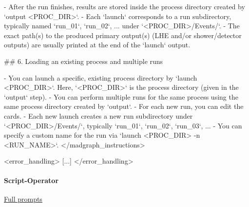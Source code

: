 \documentclass[submission, Phys]{SciPost}
\begin{document}
\begin{promptblocklit}
- After the run finishes, results are stored inside the process directory created by `output <PROC_DIR>`.
- Each `launch` corresponds to a run subdirectory, typically named `run_01`, `run_02`, ... under `<PROC_DIR>/Events/`.
- The exact path(s) to the produced primary output(s) (LHE and/or shower/detector outputs) are usually printed at the end of the `launch` output.

## 6. Loading an existing process and multiple runs

- You can launch a specific, existing process directory by `launch <PROC_DIR>`. Here, `<PROC_DIR>` is the process directory (given in the `output` step).
- You can perform multiple runs for the same process using the same process directory created by `output`.
- For each new run, you can edit the cards.
- Each new launch creates a new run subdirectory under `<PROC_DIR>/Events/`, typically `run_01`, `run_02`, `run_03`, ...
- You can specify a custom name for the run via `launch <PROC_DIR> -n <RUN_NAME>`.
</madgraph_instructions>

<error_handling>
[...]
</error_handling>
\end{promptblocklit}

\paragraph{Script-Operator} \href{https://github.com/heidelberg-hepml/MadAgents/tree/main/supplementary/prompts/Script-Operator}{Full prompts}
\end{document}
